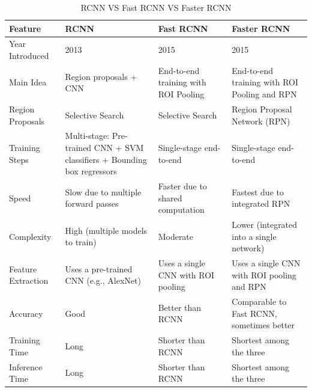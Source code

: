 \begin{longtable}{|p{2.5cm}|p{3.5cm}|p{3.5cm}|p{3.5cm}|}
    \caption{RCNN VS Fast RCNN VS Faster RCNN}\\

    \hline
    \textbf{Feature} & \textbf{RCNN} & \textbf{Fast RCNN} & \textbf{Faster RCNN} \\
    \hline
    \endfirsthead

    \hline
    \endhead
    
    \hline 
    \endfoot
    
    \hline
    \endlastfoot

    
    Year Introduced & 2013 & 2015 & 2015 \\
    \hline
    
    Main Idea & Region proposals + CNN & End-to-end training with ROI Pooling & End-to-end training with ROI Pooling and RPN \\
    \hline
    
    Region Proposals & Selective Search & Selective Search & Region Proposal Network (RPN) \\
    \hline
    
    Training Steps & Multi-stage: Pre-trained CNN + SVM classifiers + Bounding box regressors & Single-stage end-to-end & Single-stage end-to-end \\
    \hline
    
    Speed & Slow due to multiple forward passes & Faster due to shared computation & Fastest due to integrated RPN \\
    \hline
    
    Complexity & High (multiple models to train) & Moderate & Lower (integrated into a single network) \\
    \hline
    
    Feature Extraction & Uses a pre-trained CNN (e.g., AlexNet) & Uses a single CNN with ROI pooling & Uses a single CNN with ROI pooling and RPN \\
    \hline
    
    Accuracy & Good & Better than RCNN & Comparable to Fast RCNN, sometimes better \\
    \hline
    
    Training Time & Long & Shorter than RCNN & Shortest among the three \\
    \hline
    
    Inference Time & Long & Shorter than RCNN & Shortest among the three \\
\end{longtable}



